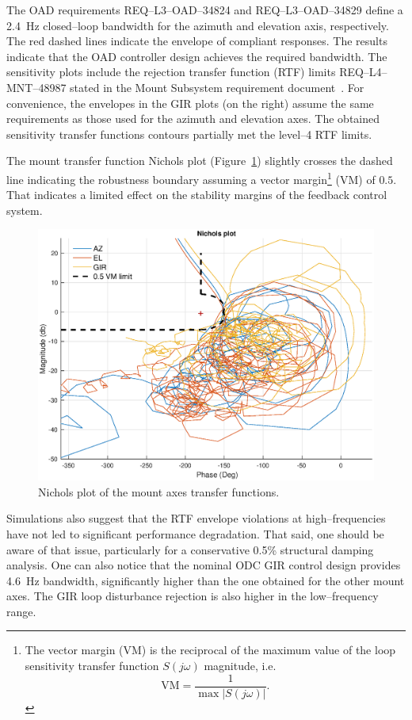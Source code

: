 %
The OAD requirements REQ--L3--OAD--34824 and REQ--L3--OAD--34829 define a \SI{2.4}{Hz} closed--loop bandwidth for the azimuth and elevation axis, respectively. The red dashed lines indicate the envelope of compliant responses. The results indicate that the OAD controller design achieves the required bandwidth. The sensitivity plots include the rejection transfer function (RTF) limits REQ--L4--MNT--48987 stated in the Mount Subsystem requirement document~\cite{MOUNT-RD}. For convenience, the envelopes in the GIR plots (on the right) assume the same requirements as those used for the azimuth and elevation axes. The obtained sensitivity transfer functions contours partially met the level--4 RTF limits. 

The mount transfer function Nichols plot (Figure~\ref{fig:mnt-nichols-plot}) slightly crosses the dashed line indicating the robustness boundary assuming a vector margin\footnote{The vector margin (VM) is the reciprocal of the maximum value of the loop sensitivity transfer function $S\left(j\omega\right)$ magnitude, i.e.$$\text{VM}=\frac{1}{\max \left|S(j\omega)\right|}.$$} (VM) of $0.5$. That indicates a limited effect on the stability margins of the feedback control system. 
\begin{figure}[!htb]
  \centering
  \includegraphics[width=\linewidth]{./ctrl_sec_images/all_mnt_axes_nichols.eps}
  \caption{Nichols plot of the mount axes transfer functions.}
  \label{fig:mnt-nichols-plot}
\end{figure}
Simulations also suggest that the RTF envelope violations at high--frequencies
have not led to significant performance degradation. That said, one should be
aware of that issue, particularly for a conservative 0.5\% structural damping
analysis. One can also notice that the nominal ODC GIR control design provides
\SI{4.6}{Hz} bandwidth, significantly higher than the one obtained for the other mount axes. The GIR loop disturbance rejection is also higher in the low--frequency range.



